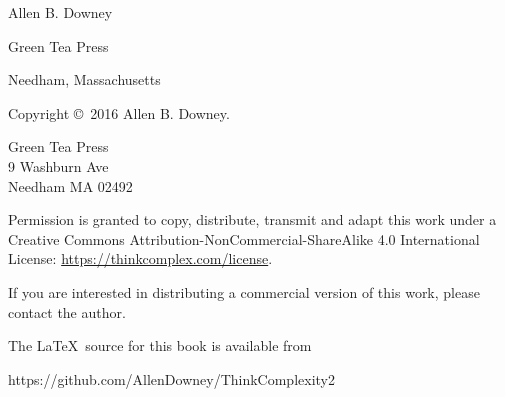 \documentclass[12pt]{book}
\newcommand{\theauthors}{Allen B. Downey}
\theoremstyle{exercise}
\begin{document}
\begin{latexonly}
\begin{flushright}
{\Large
\theauthors \\
}


\vspace{0.5in}

{\Large Green Tea Press}

{\small Needham, Massachusetts}

\vfill

\end{flushright}



\pagebreak
\thispagestyle{empty}

Copyright \copyright ~2016 \theauthors.



\vspace{0.2in}

\begin{flushleft}
Green Tea Press       \\
9 Washburn Ave \\
Needham MA 02492
\end{flushleft}

Permission is granted to copy, distribute, transmit and adapt
this work under a Creative Commons
Attribution-NonCommercial-ShareAlike 4.0 International License:
\url{https://thinkcomplex.com/license}.

If you are interested in distributing a commercial version of this
work, please contact the author.

The \LaTeX\ source for this book is available from

\begin{code}
      https://github.com/AllenDowney/ThinkComplexity2
\end{code}


\cleardoublepage
\setcounter{tocdepth}{1}
\tableofcontents

\end{latexonly}


\end{document}
